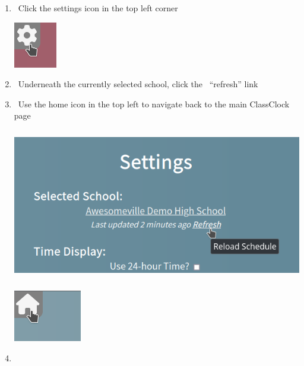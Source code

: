 \documentclass{article}
\begin{document}
\begin{enumerate}
\begin{center}
\end{center}
\item {\ Click the settings icon in the top left corner}
\begin{center}
\includegraphics[width=0.7398in,height=0.7917in]{Mini20Manual-img014.png}
\end{center}
\item {\ Underneath the currently selected school, click the \ “refresh” link }
\item {\ Use the home icon in the top left to navigate back to the main ClassClock page}
\begin{center}
\includegraphics[width=5.511in,height=2.6335in]{Mini20Manual-img015.png}
\end{center}
\begin{center}
\includegraphics[width=1.1661in,height=0.8846in]{Mini20Manual-img016.png}
\end{center}
\item {}
\begin{center}

\end{center}
\end{enumerate}
\end{document}
